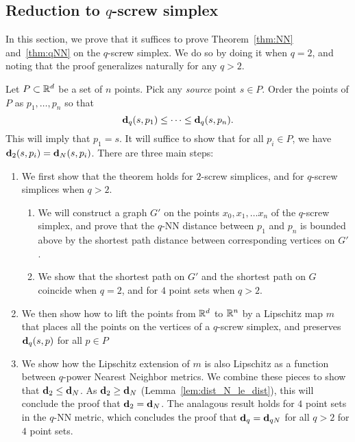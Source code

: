 \subsection{Reduction to $q$-screw simplex} %
\label{sec:reduction-to-screw}
In this section, we prove that it suffices to prove Theorem~\ref{thm:NN}
and~\ref{thm:qNN} on the $q$-screw simplex. We do so by doing it when
$q=2$, and noting that the proof generalizes naturally for any $q > 2$.

  Let $P\subset \mathbb{R}^d$ be a set of $n$ points.
  Pick any \emph{source} point $s\in P$.
  Order the points of $P$ as $p_1,\ldots ,p_n$ so that
  \[
    \mathbf{d}_q(s,p_1) \le \cdots \le \mathbf{d}_q(s, p_n).
  \]
  This will imply that $p_1 = s$.
  It will suffice to show that for all $p_i\in P$, we have $\mathbf{d}_2(s,p_i) = \mathbf{d}_N(s,p_i)$.
  There are three main steps:
  \begin{enumerate}
  \item We first show that the theorem holds for $2$-screw simplices, and
for $q$-screw simplices when $q > 2$.
\begin{enumerate}
  \item We will construct a graph $G'$ on the points $x_0, x_1, \ldots x_n$
of the $q$-screw simplex, and prove that the $q$-NN distance between $p_1$
and $p_n$ is bounded above by the shortest path distance between
corresponding vertices on $G'$.
	\item We show that the shortest path on $G'$ and the shortest path
on $G$ coincide when $q=2$, and for $4$ point sets when $q>2$.  
\end{enumerate}
  \item We then show how to lift the points from $\mathbb{R}^d$ to $\mathbb{R}^n$ by a
Lipschitz map $m$ that places all the points on the vertices of a $q$-screw
simplex, and preserves $\mathbf{d}_q(s,p)$ for all $p\in
P$
  \item We show how the Lipschitz extension of $m$ is also
Lipschitz as a function between $q$-power Nearest Neighbor metrics. 
We combine these pieces to show that $\mathbf{d}_2 \le \mathbf{d}_N$.  As $\mathbf{d}_2
\ge \mathbf{d}_N$ (Lemma~\ref{lem:dist_N_le_dist}), this will conclude the proof
that $\mathbf{d}_2 = \mathbf{d}_N$. The analagous result holds for $4$ point sets in
the $q$-NN metric, which concludes the proof that $\mathbf{d}_q = \mathbf{d}_{qN}$
for all $q>2$ for $4$ point sets.
  \end{enumerate}
  
  
  
  
  
